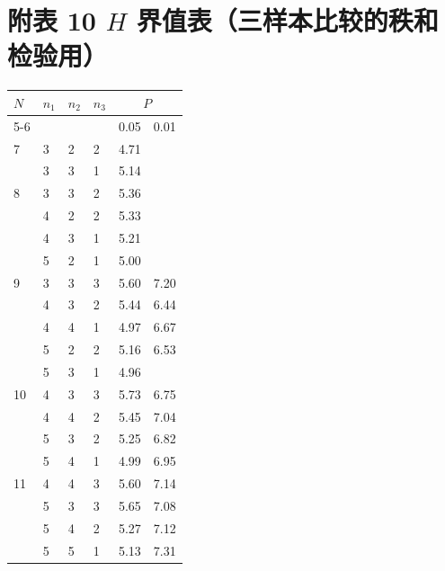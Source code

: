 \documentclass[lang=cn,10pt]{elegantbook}
\begin{document}
\newpage



\section{附表 10 $H$ 界值表（三样本比较的秩和检验用）}

\vspace{0.5em}
\centering
\begin{longtable}{p{} p{} p{} p{} p{} p{}}
    \hline
    $N$ & $n_1$ & $n_2$ & $n_3$ & \multicolumn{2}{c}{$P$} \\
    \cline{5-6}
    & & & & 0.05 & 0.01 \\
    \hline
    \endhead
    
    7 & 3 & 2 & 2 & 4.71 & \\
    & 3 & 3 & 1 & 5.14 & \\
    
    8 & 3 & 3 & 2 & 5.36 & \\
    & 4 & 2 & 2 & 5.33 & \\
    & 4 & 3 & 1 & 5.21 & \\
    & 5 & 2 & 1 & 5.00 & \\
    
    9 & 3 & 3 & 3 & 5.60 & 7.20 \\
    & 4 & 3 & 2 & 5.44 & 6.44 \\
    & 4 & 4 & 1 & 4.97 & 6.67 \\
    & 5 & 2 & 2 & 5.16 & 6.53 \\
    & 5 & 3 & 1 & 4.96 & \\
    
    10 & 4 & 3 & 3 & 5.73 & 6.75 \\
    & 4 & 4 & 2 & 5.45 & 7.04 \\
    & 5 & 3 & 2 & 5.25 & 6.82 \\
    & 5 & 4 & 1 & 4.99 & 6.95 \\
    
    11 & 4 & 4 & 3 & 5.60 & 7.14 \\
    & 5 & 3 & 3 & 5.65 & 7.08 \\
    & 5 & 4 & 2 & 5.27 & 7.12 \\
    & 5 & 5 & 1 & 5.13 & 7.31 \\
    

\end{longtable}
\end{document}
